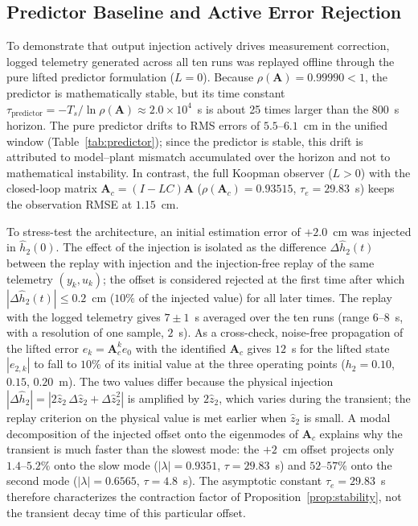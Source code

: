 \documentclass[asi,article,accept,pdftex,moreauthors]{Definitions/mdpi}
\begin{document}
\subsection{Predictor Baseline and Active Error Rejection}
\label{sec:predictor}

{To demonstrate that output injection actively drives measurement correction, logged telemetry generated across all ten runs was replayed offline through the pure lifted predictor formulation ($L=0$). Because $\rho(\mathbf A)=0.99990<1$, the predictor is mathematically stable, but its time constant $\tau_\mathrm{predictor}=-T_s/\ln\rho(\mathbf A)\approx 2.0\times 10^4$~s is about 25 times larger than the $800$~s horizon. The pure predictor drifts to RMS errors of $5.5$--$6.1$~cm in the unified window (Table~\ref{tab:predictor}); since the predictor is stable, this drift is attributed to model--plant mismatch accumulated over the horizon and not to mathematical instability. In contrast, the full Koopman observer ($L>0$) with the closed-loop matrix $\mathbf A_c=(I-LC)\mathbf A$ ($\rho(\mathbf A_c)=0.93515$, $\tau_e=29.83$~s) keeps the observation RMSE at $1.15$~cm.}

{To stress-test the architecture, an initial estimation error of $+2.0$~cm was injected in $\hat h_2(0)$. The effect of the injection is isolated as the difference $\Delta\hat h_2(t)$ between the replay with injection and the injection-free replay of the same telemetry $(y_k,u_k)$; the offset is considered rejected at the first time after which $|\Delta\hat h_2(t)|\le 0.2$~cm ($10\%$ of the injected value) for all later times. The replay with the logged telemetry gives $7\pm1$~s averaged over the ten runs (range $6$--$8$~s, with a resolution of one sample, $2$~s). As a cross-check, noise-free propagation of the lifted error $e_k=\mathbf A_c^k e_0$ with the identified $\mathbf A_c$ gives $12$~s for the lifted state $|e_{2,k}|$ to fall to $10\%$ of its initial value at the three operating points ($h_2=0.10$, $0.15$, $0.20$~m). The two values differ because the physical injection $|\Delta\hat h_2|=|2\hat z_2\,\Delta\hat z_2+\Delta\hat z_2^2|$ is amplified by $2\hat z_2$, which varies during the transient; the replay criterion on the physical value is met earlier when $\hat z_2$ is small. A modal decomposition of the injected offset onto the eigenmodes of $\mathbf A_c$ explains why the transient is much faster than the slowest mode: the $+2$~cm offset projects only $1.4$--$5.2\%$ onto the slow mode ($|\lambda|=0.9351$, $\tau=29.83$~s) and $52$--$57\%$ onto the second mode ($|\lambda|=0.6565$, $\tau=4.8$~s). The asymptotic constant $\tau_e=29.83$~s therefore characterizes the contraction factor of Proposition~\ref{prop:stability}, not the transient decay time of this particular offset.}
\end{document}

